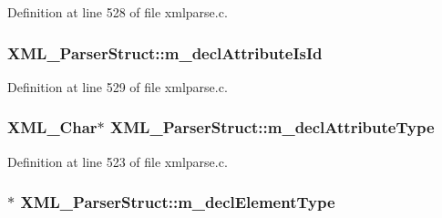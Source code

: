 Definition at line 528 of file xmlparse.\+c.

\subsubsection[{\texorpdfstring{m\+\_\+decl\+Attribute\+Is\+Id}{m_declAttributeIsId}}]{ X\+M\+L\+\_\+\+Parser\+Struct\+::m\+\_\+decl\+Attribute\+Is\+Id}\hypertarget{struct_x_m_l___parser_struct_a3fa76b6836e41c15c570de72c729244c}{}\label{struct_x_m_l___parser_struct_a3fa76b6836e41c15c570de72c729244c}


Definition at line 529 of file xmlparse.\+c.

\subsubsection[{\texorpdfstring{m\+\_\+decl\+Attribute\+Type}{m_declAttributeType}}]{ {\bf X\+M\+L\+\_\+\+Char}$\ast$ X\+M\+L\+\_\+\+Parser\+Struct\+::m\+\_\+decl\+Attribute\+Type}\hypertarget{struct_x_m_l___parser_struct_a7f3f52b0f430035348e153703c9c72b8}{}\label{struct_x_m_l___parser_struct_a7f3f52b0f430035348e153703c9c72b8}


Definition at line 523 of file xmlparse.\+c.

\subsubsection[{\texorpdfstring{m\+\_\+decl\+Element\+Type}{m_declElementType}}]{$\ast$ X\+M\+L\+\_\+\+Parser\+Struct\+::m\+\_\+decl\+Element\+Type}\hypertarget{struct_x_m_l___parser_struct_a5fb5a466742ad2554cf8e2f87abe8f50}{}\label{struct_x_m_l___parser_struct_a5fb5a466742ad2554cf8e2f87abe8f50}


